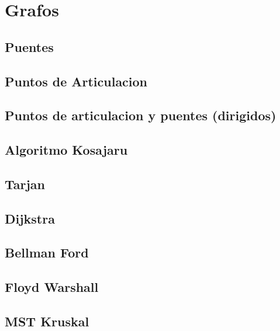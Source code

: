 \section{Grafos}
\subsection{Puentes}
\raggedbottom
\hrulefill
\subsection{Puntos de Articulacion}
\raggedbottom
\hrulefill
\subsection{Puntos de articulacion y puentes (dirigidos)}
\raggedbottom
\hrulefill
\subsection{Algoritmo Kosajaru}
\raggedbottom
\hrulefill
\subsection{Tarjan}
\raggedbottom
\hrulefill
\subsection{Dijkstra}
\raggedbottom
\hrulefill
\subsection{Bellman Ford}
\raggedbottom
\hrulefill
\subsection{Floyd Warshall}
\raggedbottom
\hrulefill
\subsection{MST Kruskal}
\raggedbottom
\hrulefill

